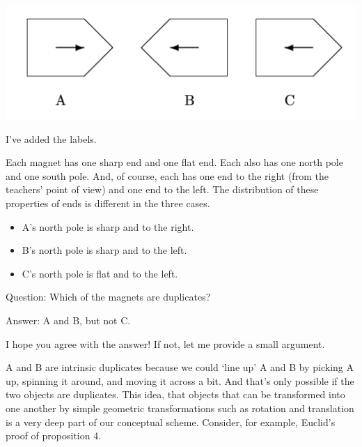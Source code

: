 \documentclass[
  10pt,
  letterpaper,
  DIV=11,
  numbers=noendperiod,
  twoside]{scrartcl}
\providecommand{\tightlist}{%
  \setlength{\itemsep}{0pt}\setlength{\parskip}{0pt}}\usepackage{longtable,booktabs,array}
\begin{document}
\includegraphics{images/amp_2.png}

I've added the labels.

Each magnet has one sharp end and one flat end. Each also has one north
pole and one south pole. And, of course, each has one end to the right
(from the teachers' point of view) and one end to the left. The
distribution of these properties of ends is different in the three
cases.

\begin{itemize}
\tightlist
\item
  A's north pole is sharp and to the right.
\item
  B's north pole is sharp and to the left.
\item
  C's north pole is flat and to the left.
\end{itemize}

Question: Which of the magnets are duplicates?

Answer: A and B, but not C.

I hope you agree with the answer! If not, let me provide a small
argument.

A and B are intrinsic duplicates because we could `line up' A and B by
picking A up, spinning it around, and moving it across a bit. And that's
only possible if the two objects are duplicates. This idea, that objects
that can be transformed into one another by simple geometric
transformations such as rotation and translation is a very deep part of
our conceptual scheme. Consider, for example, Euclid's proof of
proposition 4.
\end{document}
